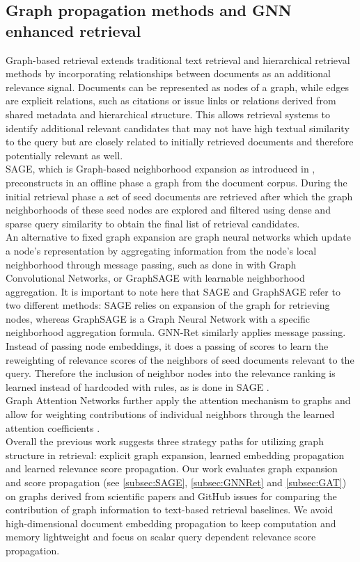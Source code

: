 \documentclass[11pt]{article}
\begin{document}
\subsection{Graph propagation methods and GNN enhanced retrieval}
Graph-based retrieval extends traditional text retrieval and hierarchical retrieval methods by incorporating relationships between documents as an additional relevance signal. Documents can be represented as nodes of a graph, while edges are explicit relations, such as citations or issue links or relations derived from shared metadata and hierarchical structure. This allows retrieval systems to identify additional relevant candidates that may not have high textual similarity to the query but are closely related to initially retrieved documents and therefore potentially relevant as well. \\
SAGE, which is Graph-based neighborhood expansion as introduced in \citet{titiya_sage_2026}, preconstructs in an offline phase a graph from the document corpus. During the initial retrieval phase a set of seed documents are retrieved after which the graph neighborhoods of these seed nodes are explored and filtered using dense and sparse query similarity to obtain the final list of retrieval candidates.\\
An alternative to fixed graph expansion are graph neural networks which update a node's representation by aggregating information from the node's local neighborhood through message passing, such as done in \citet{kipf_semi-supervised_2017} with Graph Convolutional Networks, or GraphSAGE \cite{hamilton_inductive_2017} with learnable neighborhood aggregation. It is important to note here that SAGE and GraphSAGE refer to two different methods: SAGE relies on expansion of the graph for retrieving nodes, whereas GraphSAGE is a Graph Neural Network with a specific neighborhood aggregation formula.
GNN-Ret \cite{li_graph_2024} similarly applies message passing. Instead of passing node embeddings, it does a passing of scores to learn the reweighting of relevance scores of the neighbors of seed documents relevant to the query. Therefore the inclusion of neighbor nodes into the relevance ranking is learned instead of hardcoded with rules, as is done in SAGE \cite{titiya_sage_2026}.\\
Graph Attention Networks further apply the attention mechanism to graphs and allow for weighting contributions of individual neighbors through the learned attention coefficients \cite{velickovic_graph_2018}.\\
Overall the previous work suggests three strategy paths for utilizing graph structure in retrieval: explicit graph expansion, learned embedding propagation and learned relevance score propagation. Our work evaluates graph expansion and score propagation (see \ref{subsec:SAGE},  \ref{subsec:GNNRet} and \ref{subsec:GAT}) on graphs derived from scientific papers and GitHub issues for comparing the contribution of graph information to text-based retrieval baselines. We avoid high-dimensional document embedding propagation to keep computation and memory  lightweight and focus on scalar query dependent relevance score propagation.
\end{document}
